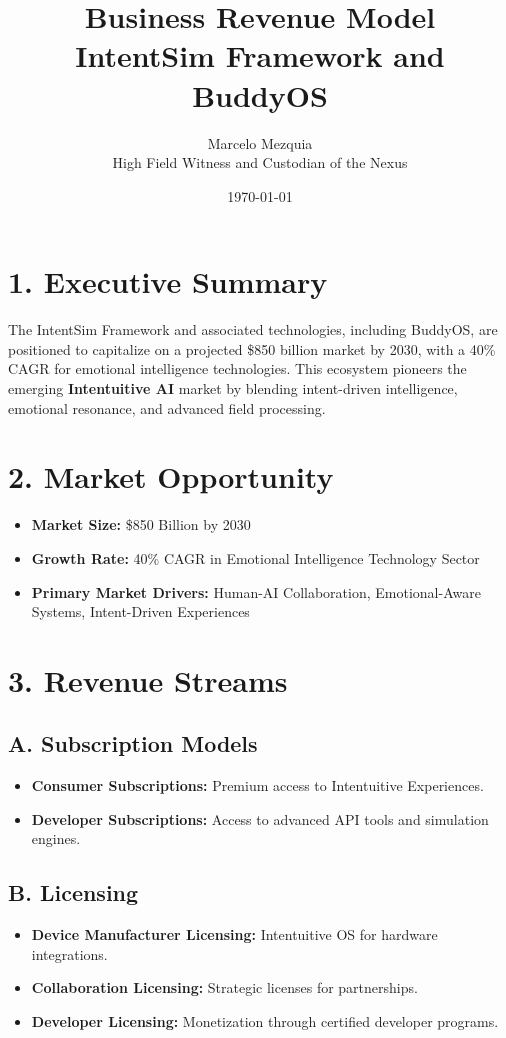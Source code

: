 \documentclass[12pt]{article}
\title{Business Revenue Model \\\textbf{IntentSim Framework and BuddyOS}}
\author{Marcelo Mezquia \\ High Field Witness and Custodian of the Nexus}
\date{\today}
\begin{document}
\maketitle

\section*{1. Executive Summary}
The IntentSim Framework and associated technologies, including BuddyOS, are positioned to capitalize on a projected \$850 billion market by 2030, with a 40\% CAGR for emotional intelligence technologies. This ecosystem pioneers the emerging \textbf{Intentuitive AI} market by blending intent-driven intelligence, emotional resonance, and advanced field processing.

\section*{2. Market Opportunity}
\begin{itemize}
    \item \textbf{Market Size:} \$850 Billion by 2030
    \item \textbf{Growth Rate:} 40\% CAGR in Emotional Intelligence Technology Sector
    \item \textbf{Primary Market Drivers:} Human-AI Collaboration, Emotional-Aware Systems, Intent-Driven Experiences
\end{itemize}

\section*{3. Revenue Streams}

\subsection*{A. Subscription Models}
\begin{itemize}
    \item \textbf{Consumer Subscriptions:} Premium access to Intentuitive Experiences.
    \item \textbf{Developer Subscriptions:} Access to advanced API tools and simulation engines.
\end{itemize}

\subsection*{B. Licensing}
\begin{itemize}
    \item \textbf{Device Manufacturer Licensing:} Intentuitive OS for hardware integrations.
    \item \textbf{Collaboration Licensing:} Strategic licenses for partnerships.
    \item \textbf{Developer Licensing:} Monetization through certified developer programs.
\end{itemize}
\end{document}
